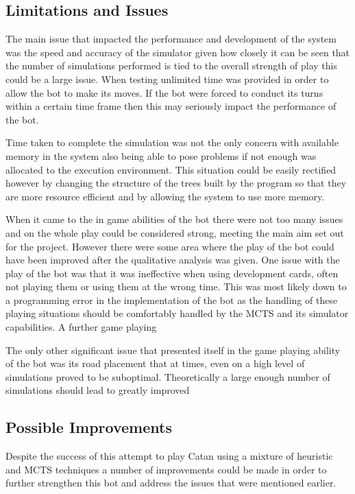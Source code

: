 \documentclass[]{article}
\begin{document}
\subsection{Limitations and Issues}
The main issue that impacted the performance and development of the system was the speed and accuracy of the simulator given how closely it can be seen that the number of simulations performed is tied to the overall strength of play this could be a large issue. When testing unlimited time was provided in order to allow the bot to make its moves. If the bot were forced to conduct its turns within a certain time frame then this may seriously impact the performance of the bot. 

\par Time taken to complete the simulation was not the only concern with available memory in the system also being able to pose problems if not enough was allocated to the execution environment. This situation could be easily rectified however by changing the structure of the trees built by the program so that they are more resource efficient and by allowing the system to use more memory.

\par When it came to the in game abilities of the bot there were not too many issues and on the whole play could be considered strong, meeting the main aim set out for the project. However there were some area where the play of the bot could have been improved after the qualitative analysis was given. One issue with the play of the bot was that it was ineffective when using development cards, often not playing them or using them at the wrong time. This was most likely down to a programming error in the implementation of the bot as the handling of these playing situations should be comfortably handled by the MCTS and its simulator capabilities. A further game playing 

\par The only other significant issue that presented itself in the game playing ability of the bot was its road placement that at times, even on a high level of simulations proved to be suboptimal. Theoretically a large enough number of simulations should lead to greatly improved 

\subsection{Possible Improvements}
Despite the success of this attempt to play Catan using a mixture of heuristic and MCTS techniques a number of improvements could be made in order to further strengthen this bot and address the issues that were mentioned earlier.
\end{document}

